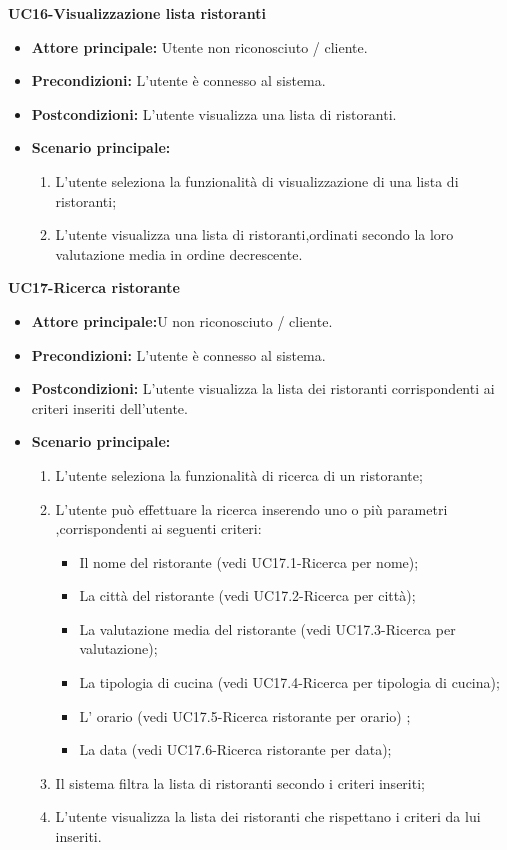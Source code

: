 \textbf{UC16-Visualizzazione lista ristoranti}
\begin{itemize}
\item \textbf{Attore principale:} Utente non riconosciuto / cliente.
\item \textbf{Precondizioni:} L'utente è connesso al sistema.
\item \textbf{Postcondizioni:} L'utente visualizza una lista di ristoranti.
\item \textbf{Scenario principale:}
\begin{enumerate}
    \item L'utente seleziona la funzionalità di visualizzazione di una lista di ristoranti;
    \item L'utente visualizza una lista di ristoranti,ordinati secondo la loro valutazione media in ordine decrescente.
\end{enumerate}
\end{itemize}

\textbf{UC17-Ricerca ristorante}
\begin{itemize}
\item \textbf{Attore principale:}U non riconosciuto / cliente.
\item \textbf{Precondizioni:} L'utente è connesso al sistema.
\item \textbf{Postcondizioni:} L'utente visualizza la lista dei ristoranti corrispondenti ai criteri inseriti
dell'utente.
\item \textbf{Scenario principale:}
\begin{enumerate}
    \item L'utente seleziona la funzionalità di ricerca di un ristorante;
    \item L'utente può effettuare la ricerca inserendo uno o più parametri ,corrispondenti
    ai seguenti criteri:
    \begin{itemize}
        \item Il nome del ristorante (vedi UC17.1-Ricerca per nome);
        \item La città del ristorante (vedi UC17.2-Ricerca per città);
        \item La valutazione media del ristorante (vedi UC17.3-Ricerca per valutazione);
        \item La tipologia di cucina (vedi UC17.4-Ricerca per tipologia di cucina);
        \item L' orario (vedi UC17.5-Ricerca ristorante per orario) ;
        \item La data (vedi UC17.6-Ricerca ristorante per data); 
    \end{itemize}
    \item  Il sistema filtra la lista di ristoranti secondo i criteri inseriti;
    \item L'utente visualizza la lista dei ristoranti che rispettano i criteri da lui inseriti.
\end{enumerate}
\end{itemize}

